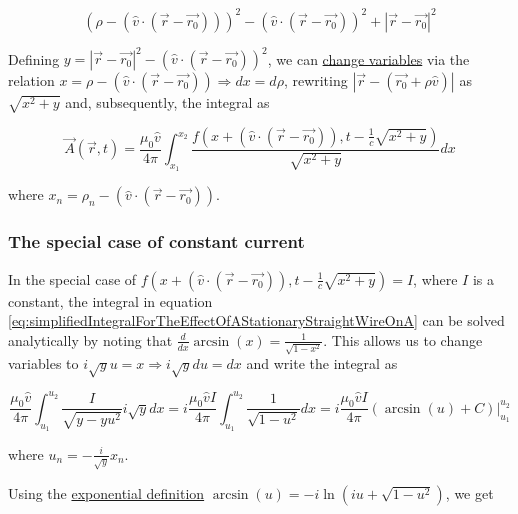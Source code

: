 ﻿\documentclass{article}
\begin{document}
\begin{equation*}
    (\rho - (\hat{v} \cdot (\vec{r} - \vec{r_0})))^2 - (\hat{v} \cdot (\vec{r} - \vec{r_0}))^2 + |\vec{r} - \vec{r_0}|^2
\end{equation*}

Defining $y = |\vec{r} - \vec{r_0}|^2 - (\hat{v} \cdot (\vec{r} - \vec{r_0}))^2$, we can \href{https://en.wikipedia.org/wiki/Change_of_variables}{change variables} via the relation $x = \rho - (\hat{v} \cdot (\vec{r} - \vec{r_0})) \Rightarrow dx = d \rho$, rewriting $|\vec{r} - (\vec{r_0} + \rho \hat{v})|$ as $\sqrt{x^2 + y}$ and, subsequently, the integral as

\begin{equation}
    \label{eq:simplifiedIntegralForTheEffectOfAStationaryStraightWireOnA}
    \vec{A}(\vec{r}, t) = \frac{\mu_0 \hat{v}}{4 \pi} \int_{x_1}^{x_2} \frac{f(x + (\hat{v} \cdot (\vec{r} - \vec{r_0})), t - \frac{1}{c} \sqrt{x^2 + y})}{\sqrt{x^2 + y}} dx
\end{equation}

where $x_n = \rho_n - (\hat{v} \cdot (\vec{r} - \vec{r_0}))$.

\subsubsection{The special case of constant current}

In the special case of $f(x + (\hat{v} \cdot (\vec{r} - \vec{r_0})), t - \frac{1}{c} \sqrt{x^2 + y}) = I$, where $I$ is a constant, the integral in equation \ref{eq:simplifiedIntegralForTheEffectOfAStationaryStraightWireOnA} can be solved analytically by noting that $\frac{d}{dx} \arcsin(x) = \frac{1}{\sqrt{1-x^2}}$. This allows us to change variables to $i \sqrt{y} u = x \Rightarrow i \sqrt{y} du = dx$ and write the integral as

\begin{equation*}
    \frac{\mu_0 \hat{v}}{4 \pi} \int_{u_1}^{u_2} \frac{I}{\sqrt{y - y u^2}} i \sqrt{y} dx = i \frac{\mu_0 \hat{v} I}{4 \pi} \int_{u_1}^{u_2} \frac{1}{\sqrt{1 - u^2}} dx = i \frac{\mu_0 \hat{v} I}{4 \pi} (\arcsin(u) + C) |_{u_1}^{u_2}
\end{equation*}

where $u_n = - \frac{i}{\sqrt{y}} x_n$.

Using the \href{https://en.wikipedia.org/wiki/List_of_trigonometric_identities#Exponential_definitions}{exponential definition} $\arcsin(u) = -i\ln(iu + \sqrt{1 - u^2})$, we get
\end{document}

